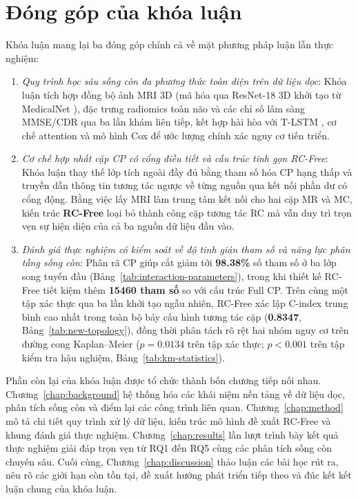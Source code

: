 \FloatBarrier
{}
\section{Đóng góp của khóa luận}
Khóa luận mang lại ba đóng góp chính cả về mặt phương pháp luận lẫn thực nghiệm:
\begin{enumerate}
\item \emph{Quy trình học sâu sống còn đa phương thức toàn diện trên dữ liệu dọc}: Khóa luận tích hợp đồng bộ ảnh MRI 3D (mã hóa qua ResNet-18 3D khởi tạo từ MedicalNet \cite{chen2019med3d}), đặc trưng radiomics toàn não và các chỉ số lâm sàng MMSE/CDR qua ba lần khám liên tiếp, kết hợp hài hòa với T-LSTM \cite{baytas2017patient}, cơ chế attention và mô hình Cox để ước lượng chính xác nguy cơ tiến triển.
\item \emph{Cơ chế hợp nhất cặp CP có cổng điều tiết và cấu trúc tinh gọn RC-Free}: Khóa luận thay thế lớp tích ngoài đầy đủ bằng tham số hóa CP hạng thấp và truyền dẫn thông tin tương tác ngược về từng nguồn qua kết nối phần dư có cổng động. Bằng việc lấy MRI làm trung tâm kết nối cho hai cặp MR và MC, kiến trúc \textbf{RC-Free} loại bỏ thành công cặp tương tác RC mà vẫn duy trì trọn vẹn sự hiện diện của cả ba nguồn dữ liệu đầu vào.
\item \emph{Đánh giá thực nghiệm có kiểm soát về độ tinh giản tham số và năng lực phân tầng sống còn}: Phân rã CP giúp cắt giảm tới \textbf{98.38\%} số tham số ở ba lớp song tuyến đầu (Bảng~\ref{tab:interaction-parameters}), trong khi thiết kế RC-Free tiết kiệm thêm \textbf{15460 tham số} so với cấu trúc Full CP. Trên cùng một tập xác thực qua ba lần khởi tạo ngẫu nhiên, RC-Free xác lập C-index trung bình cao nhất trong toàn bộ bảy cấu hình tương tác cặp (\textbf{0.8347}, Bảng~\ref{tab:new-topology}), đồng thời phân tách rõ rệt hai nhóm nguy cơ trên đường cong Kaplan--Meier ($p=0.0134$ trên tập xác thực; $p<0.001$ trên tập kiểm tra hậu nghiệm, Bảng~\ref{tab:km-statistics}).
\end{enumerate}

Phần còn lại của khóa luận được tổ chức thành bốn chương tiếp nối nhau. Chương~\ref{chap:background} hệ thống hóa các khái niệm nền tảng về dữ liệu dọc, phân tích sống còn và điểm lại các công trình liên quan. Chương~\ref{chap:method} mô tả chi tiết quy trình xử lý dữ liệu, kiến trúc mô hình đề xuất RC-Free và khung đánh giá thực nghiệm. Chương~\ref{chap:results} lần lượt trình bày kết quả thực nghiệm giải đáp trọn vẹn từ RQ1 đến RQ5 cùng các phân tích sống còn chuyên sâu. Cuối cùng, Chương~\ref{chap:discussion} thảo luận các bài học rút ra, nêu rõ các giới hạn còn tồn tại, đề xuất hướng phát triển tiếp theo và đúc kết kết luận chung của khóa luận.
